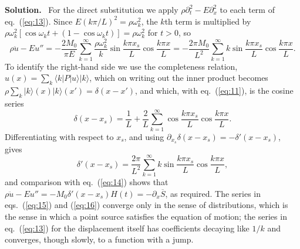 \documentclass[a4paper,12pt]{paper}
\newenvironment{solution}{\par\noindent\textbf{Solution.}\ }{\par\medskip}
\begin{document}
\begin{solution}
For the direct substitution we apply $\rho\partial_{t}^{2}-E\partial_{x}^{2}$ to each term of
eq.~(\ref{eq:13}). Since $E(k\pi/L)^{2}=\rho\omega_{k}^{2}$, the $k$th term is multiplied by
$\rho\omega_{k}^{2}[\cos\omega_{k}t+(1-\cos\omega_{k}t)]=\rho\omega_{k}^{2}$ for $t>0$, so
\begin{equation}
\rho\ddot{u}-Eu''=-\frac{2M_{0}}{\pi E}\sum_{k=1}^{\infty}\frac{\rho\omega_{k}^{2}}{k}\sin\frac{k\pi x_{s}}{L}\cos\frac{k\pi x}{L}
=-\frac{2\pi M_{0}}{L^{2}}\sum_{k=1}^{\infty}k\sin\frac{k\pi x_{s}}{L}\cos\frac{k\pi x}{L}.
\label{eq:14}
\end{equation}
To identify the right-hand side we use the completeness relation,
$u(x)=\sum_{k}\langle k|P|u\rangle|k\rangle$, which on writing out the inner product becomes
$\rho\sum_{k}|k\rangle(x)|k\rangle(x')=\delta(x-x')$, and which, with eq.~(\ref{eq:11}), is the
cosine series
\begin{equation}
\delta(x-x_{s})=\frac{1}{L}+\frac{2}{L}\sum_{k=1}^{\infty}\cos\frac{k\pi x_{s}}{L}\cos\frac{k\pi x}{L}.
\label{eq:15}
\end{equation}
Differentiating with respect to $x_{s}$, and using $\partial_{x_{s}}\delta(x-x_{s})=-\delta'(x-x_{s})$, gives
\begin{equation}
\delta'(x-x_{s})=\frac{2\pi}{L^{2}}\sum_{k=1}^{\infty}k\sin\frac{k\pi x_{s}}{L}\cos\frac{k\pi x}{L},
\label{eq:16}
\end{equation}
and comparison with eq.~(\ref{eq:14}) shows that
$\rho\ddot{u}-Eu''=-M_{0}\delta'(x-x_{s})H(t)=-\partial_{x}\overline{S}$, as required. The series in
eqs.~(\ref{eq:15}) and (\ref{eq:16}) converge only in the sense of distributions, which is the sense in
which a point source satisfies the equation of motion; the series in eq.~(\ref{eq:13}) for the
displacement itself has coefficients decaying like $1/k$ and converges, though slowly, to a function
with a jump.


\end{solution}
\end{document}
